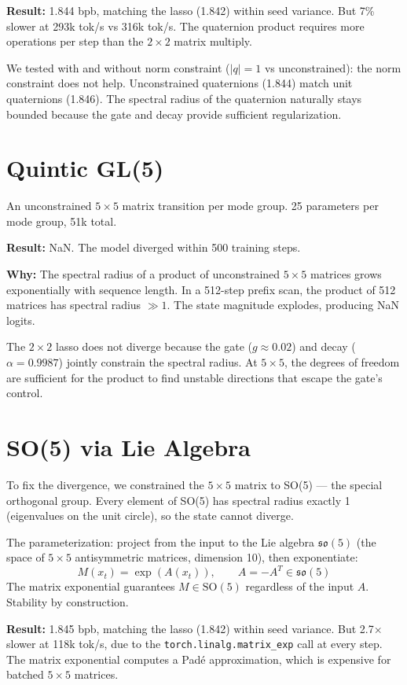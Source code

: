 \documentclass[11pt,a4paper]{report}
\begin{document}
\textbf{Result:} 1.844 bpb, matching the lasso (1.842) within seed variance. But 7\% slower at 293k tok/s vs 316k tok/s. The quaternion product requires more operations per step than the $2 \times 2$ matrix multiply.

We tested with and without norm constraint ($|q| = 1$ vs unconstrained): the norm constraint does not help. Unconstrained quaternions (1.844) match unit quaternions (1.846). The spectral radius of the quaternion naturally stays bounded because the gate and decay provide sufficient regularization.

\section{Quintic GL(5)}

An unconstrained $5 \times 5$ matrix transition per mode group. 25 parameters per mode group, 51k total.

\textbf{Result:} NaN. The model diverged within 500 training steps.

\textbf{Why:} The spectral radius of a product of unconstrained $5 \times 5$ matrices grows exponentially with sequence length. In a 512-step prefix scan, the product of 512 matrices has spectral radius $\gg 1$. The state magnitude explodes, producing NaN logits.

The $2 \times 2$ lasso does not diverge because the gate ($g \approx 0.02$) and decay ($\alpha = 0.9987$) jointly constrain the spectral radius. At $5 \times 5$, the degrees of freedom are sufficient for the product to find unstable directions that escape the gate's control.

\section{SO(5) via Lie Algebra}

To fix the divergence, we constrained the $5 \times 5$ matrix to SO(5) --- the special orthogonal group. Every element of SO(5) has spectral radius exactly 1 (eigenvalues on the unit circle), so the state cannot diverge.

The parameterization: project from the input to the Lie algebra $\mathfrak{so}(5)$ (the space of $5 \times 5$ antisymmetric matrices, dimension 10), then exponentiate:
\[
M(x_t) = \exp(A(x_t)), \qquad A = -A^T \in \mathfrak{so}(5)
\]
The matrix exponential guarantees $M \in \text{SO}(5)$ regardless of the input $A$. Stability by construction.

\textbf{Result:} 1.845 bpb, matching the lasso (1.842) within seed variance. But 2.7$\times$ slower at 118k tok/s, due to the \texttt{torch.linalg.matrix\_exp} call at every step. The matrix exponential computes a Pad\'{e} approximation, which is expensive for batched $5 \times 5$ matrices.
\end{document}
